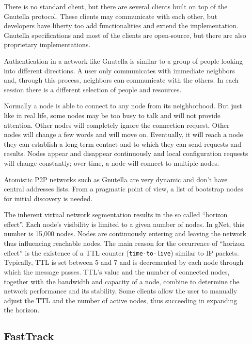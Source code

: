 There is no standard client, but there are several clients built on top of the
Gnutella protocol. These clients may communicate with each other, but
developers have liberty too add functionalities and extend the implementation.
Gnutella specifications and most of the clients are open-source, but there are
also proprietary implementations.

Authentication in a network like Gnutella is similar to a group of people
looking into different directions. A user only communicates with immediate
neighbors and, through this process, neighbors can communicate with the others.
In each session there is a different selection of people and resources.

Normally a node is able to connect to any node from its neighborhood. But just
like in real life, some nodes may be too busy to talk and will not provide
attention. Other nodes will completely ignore the connection request. Other
nodes will change a few words and will move on. Eventually, it will reach a
node they can establish a long-term contact and to which they can send
requests and results. Nodes appear and disappear continuously and local
configuration requests will change constantly; over time, a node will connect
to multiple nodes.

Atomistic P2P networks such as Gnutella are very dynamic and don't have central
addresses lists. From a pragmatic point of view, a list of bootstrap nodes for
initial discovery is needed.

The inherent virtual network segmentation results in the so called ``horizon
effect''. Each node's visibility is limited to a given number of nodes. In
gNet, this number is 15,000 nodes. Nodes are continuously entering and leaving
the network thus influencing reachable nodes. The main reason for the
occurrence of ``horizon effect'' is the existence of a TTL counter
(\texttt{time-to-live}) similar to IP packets. Typically, TTL is set between 5
and 7 and is decremented by each node through which the message passes. TTL's
value and the number of connected nodes, together with the bandwidth and
capacity of a node, combine to determine the network performance and its
stability. Some clients allow the user to manually adjust the TTL and the
number of active nodes, thus succeeding in expanding the horizon.

\subsection{FastTrack}

